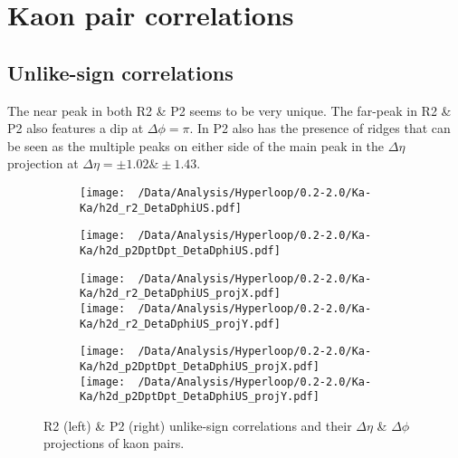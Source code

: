 \documentclass[12pt,a4paper,twoside]{report}
\begin{document}
\section{Kaon pair correlations}
\subsection{Unlike-sign correlations}
The near peak in both R2 \& P2 seems to be very unique. The far-peak in R2 \& P2 also features a dip at $\Delta\phi=\pi$. In P2 also has the presence of ridges that can be seen as the multiple peaks on either side of the main peak in the $\Delta\eta$ projection at $\Delta\eta=\pm1.02\&\pm1.43$.
\begin{figure}[H]
	\begin{subfigure}{0.49\linewidth}
		\texttt{[image: ~/Data/Analysis/Hyperloop/0.2-2.0/Ka-Ka/h2d\_r2\_DetaDphiUS.pdf]}\\
	\end{subfigure}
	\begin{subfigure}{0.49\linewidth}
		\texttt{[image: ~/Data/Analysis/Hyperloop/0.2-2.0/Ka-Ka/h2d\_p2DptDpt\_DetaDphiUS.pdf]}\\
	\end{subfigure}
\end{figure}
\begin{figure}[H]
	\ContinuedFloat
	\begin{subfigure}{0.49\linewidth}
		\texttt{[image: ~/Data/Analysis/Hyperloop/0.2-2.0/Ka-Ka/h2d\_r2\_DetaDphiUS\_projX.pdf]}\\
		\texttt{[image: ~/Data/Analysis/Hyperloop/0.2-2.0/Ka-Ka/h2d\_r2\_DetaDphiUS\_projY.pdf]}\\
	\end{subfigure}
	\begin{subfigure}{0.49\linewidth}
		\texttt{[image: ~/Data/Analysis/Hyperloop/0.2-2.0/Ka-Ka/h2d\_p2DptDpt\_DetaDphiUS\_projX.pdf]}\\
		\texttt{[image: ~/Data/Analysis/Hyperloop/0.2-2.0/Ka-Ka/h2d\_p2DptDpt\_DetaDphiUS\_projY.pdf]}\\
	\end{subfigure}
	\caption{R2 (left) \& P2 (right) unlike-sign correlations and their $\Delta\eta$ \& $\Delta\phi$ projections of kaon pairs.}
\end{figure}
\end{document}
